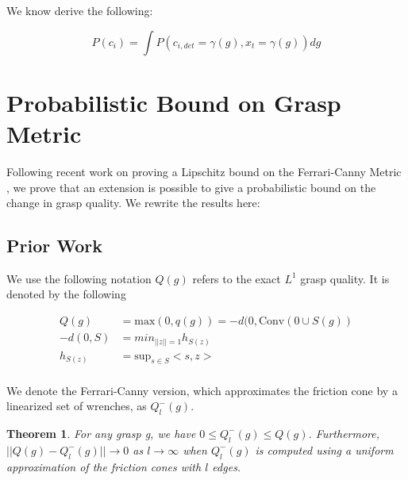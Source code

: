 \documentclass[letterpaper, 10 pt, conference]{ieeeconf}  %
\newtheorem{theorem}{Theorem}
\begin{document}
We know derive the following: 

\begin{equation}
P(c_{i}) = \int P(c_{i,det}=\gamma(g),x_t = \gamma(g)) dg
\end{equation}

\section{Probabilistic Bound on Grasp Metric}


Following recent work on proving a Lipschitz bound on the Ferrari-Canny Metric \cite{pokorny2013classical}, we prove that an extension is possible to give a probabilistic bound on the change in grasp quality. We rewrite the results here:

\subsection{Prior Work}

We use the following notation $Q(g)$ refers to the exact $L^1$ grasp quality. It is denoted by the following 

\begin{align}
Q(g) &= \mbox{max}(0,q(g)) = -d(0,\mbox{Conv}(0 \cup S(g))\\
-d(0,S) &= min_{||z|| = 1} h_{S(z)}\\
h_{S(z)} &= \mbox{sup}_{s\in S}<s,z>\\
\end{align}

We denote the Ferrari-Canny version, which approximates the friction cone by a linearized set of wrenches\cite{ferrari1992}, as $Q^-_l(g)$.\\

\begin{theorem}
For any grasp g, we have $0 \leq Q_l^-(g) \leq Q(g)$. Furthermore, $||Q(g) - Q^-_l(g)|| \rightarrow 0$ as $l \rightarrow \infty$ when $Q_l^-(g)$ is computed using a uniform approximation of the friction cones with $l$ edges. \\
\end{theorem}
\end{document}
